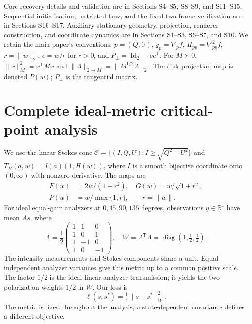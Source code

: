 \noindent Core recovery details and validation are in Sections S4--S5, S8--S9, and S11--S15. Sequential initialization, restricted flow, and the fixed two-frame verification are in Sections S16--S17. Auxiliary stationary geometry, projection, renderer construction, and coordinate dynamics are in Sections S1--S3, S6--S7, and S10. We retain the main paper's conventions: $p=(Q,U)$, $g_p=\nabla_p f$, $H_{pp}=\nabla^2_{pp}f$, $r=\|w\|_2$, $e=w/r$ for $r>0$, and $P_\perp=\operatorname{Id}_2-ee^{\mathsf T}$. For $M\succ0$, $\|x\|_M^2=x^{\mathsf T}Mx$ and $\|A\|_{2\to M}=\|M^{1/2}A\|_2$. The disk-projection map is denoted $P(w)$; $P_\perp$ is the tangential matrix.

\section{Complete ideal-metric critical-point analysis}
\label{sec:ideal}
We use the linear-Stokes cone $\mathcal C=\{(I,Q,U):I\geq\sqrt{Q^2+U^2}\}$ and $T_H(a,w)=I(a)(1,H(w))$, where $I$ is a smooth bijective coordinate onto $(0,\infty)$ with nonzero derivative. The maps are
\begin{equation}
 \begin{aligned}
 F(w)&=2w/(1+r^2),\quad G(w)=w/\sqrt{1+r^2},\\
 P(w)&=w/\max\{1,r\},\qquad r=\|w\|.
 \end{aligned}
\end{equation}
For ideal equal-gain analyzers at $0,45,90,135$ degrees, observations $y\in\mathbb R^4$ have mean $As$, where
\begin{equation}
 A=\frac12\begin{pmatrix}1&1&0\\1&0&1\\1&-1&0\\1&0&-1\end{pmatrix},
 \quad W=A^\mathsf TA=\operatorname{diag}(1,\tfrac12,\tfrac12).
 \label{eq:analyzer}
\end{equation}
The intensity measurements and Stokes components share a unit. Equal independent analyzer variances give this metric up to a common positive scale. The factor $1/2$ is the ideal linear-analyzer transmission; it yields the two polarization weights $1/2$ in $W$. Our loss is
\begin{equation}
 \ell(s;s^*)=\tfrac12\|s-s^*\|_W^2.
 \label{eq:loss}
\end{equation}
The metric is fixed throughout the analysis; a state-dependent covariance defines a different objective.

